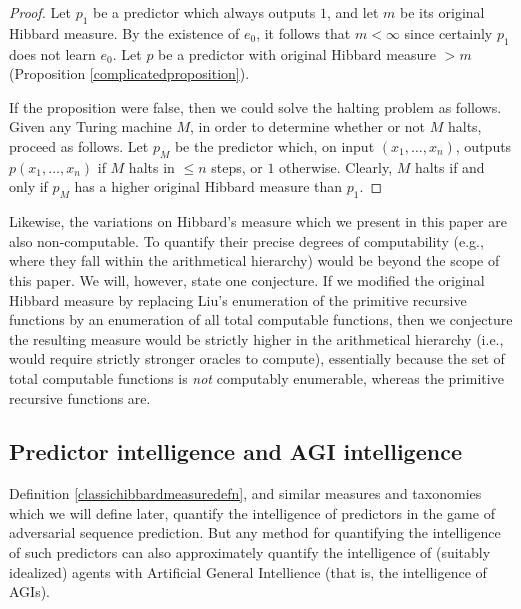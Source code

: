 \documentclass[twoside,11pt]{article}
\begin{document}
\begin{proof}
    Let $p_1$ be a predictor which always outputs $1$, and let $m$ be its
    original Hibbard measure. By the existence of $e_0$, it
    follows that $m<\infty$ since certainly $p_1$ does not learn $e_0$.
    Let $p$ be a predictor with
    original Hibbard measure $>m$
    (Proposition \ref{complicatedproposition}).

    If the proposition were false, then we could solve
    the halting problem as follows.
    Given any Turing machine $M$, in order to determine whether or not $M$ halts,
    proceed as follows. Let $p_M$ be the predictor which, on
    input $(x_1,\ldots,x_n)$, outputs $p(x_1,\ldots,x_n)$
    if $M$ halts in $\leq n$ steps, or $1$ otherwise.
    Clearly, $M$ halts if and only if $p_M$ has a higher original Hibbard
    measure than $p_1$.
\end{proof}

Likewise, the variations on Hibbard's measure which we present in this paper are also
non-computable. To quantify their precise degrees of computability (e.g., where they
fall within the arithmetical hierarchy) would be beyond the scope of this paper.
We will, however, state one conjecture. If we modified the original Hibbard
measure by replacing Liu's enumeration of the primitive recursive functions by an
enumeration of all total computable functions, then we conjecture the resulting measure would
be strictly higher in the arithmetical hierarchy (i.e., would require strictly
stronger oracles to compute), essentially because the set of total computable functions
is \emph{not} computably enumerable, whereas the primitive recursive functions are.

\subsection{Predictor intelligence and AGI intelligence}
\label{agiproxysection}

Definition \ref{classichibbardmeasuredefn}, and similar measures and taxonomies
which we will
define later, quantify the intelligence of predictors in the game of
adversarial sequence prediction.
But any method for quantifying the intelligence of such predictors can also
approximately quantify the intelligence of (suitably idealized)
agents with Artificial General Intellience (that is, the intelligence of AGIs).
\end{document}
